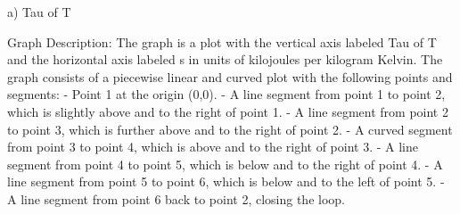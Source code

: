 a) Tau of T

Graph Description:
The graph is a plot with the vertical axis labeled Tau of T and the horizontal axis labeled s in units of kilojoules per kilogram Kelvin. The graph consists of a piecewise linear and curved plot with the following points and segments:
- Point 1 at the origin (0,0).
- A line segment from point 1 to point 2, which is slightly above and to the right of point 1.
- A line segment from point 2 to point 3, which is further above and to the right of point 2.
- A curved segment from point 3 to point 4, which is above and to the right of point 3.
- A line segment from point 4 to point 5, which is below and to the right of point 4.
- A line segment from point 5 to point 6, which is below and to the left of point 5.
- A line segment from point 6 back to point 2, closing the loop.